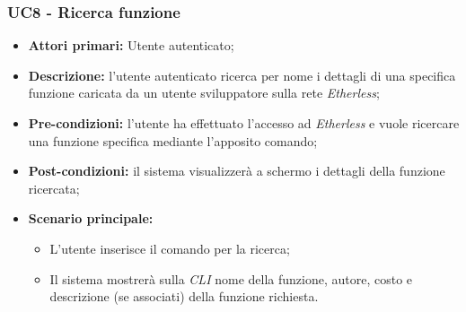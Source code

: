 \subsubsection{UC8 - Ricerca funzione}
\begin{itemize}
	\item \textbf{Attori primari:} Utente autenticato;
	\item \textbf{Descrizione:} l'utente autenticato ricerca per nome i dettagli di una specifica funzione caricata da un utente sviluppatore sulla rete \textit{Etherless}; 
	\item \textbf{Pre-condizioni:} l'utente ha effettuato l'accesso ad \textit{Etherless} e vuole ricercare una funzione specifica mediante l'apposito comando;
	\item \textbf{Post-condizioni:} il sistema visualizzerà a schermo i dettagli della funzione ricercata;
	\item \textbf{Scenario principale:} 
	\begin{itemize}
		\item L'utente inserisce il comando per la ricerca;
		\item Il sistema mostrerà sulla \textit{CLI\glo} nome della funzione, autore, costo e descrizione (se associati) della funzione richiesta.
	\end{itemize}
\end{itemize}